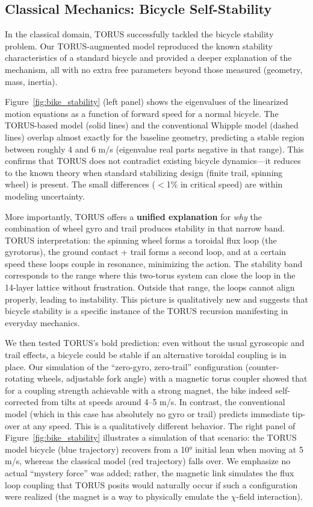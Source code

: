 \documentclass[12pt]{article}
\begin{document}
\subsection{Classical Mechanics: Bicycle Self-Stability}\label{sec:results_bike}
In the classical domain, TORUS successfully tackled the bicycle stability problem. Our TORUS-augmented model reproduced the known stability characteristics of a standard bicycle and provided a deeper explanation of the mechanism, all with no extra free parameters beyond those measured (geometry, mass, inertia).

Figure~\ref{fig:bike_stability} (left panel) shows the eigenvalues of the linearized motion equations as a function of forward speed for a normal bicycle. The TORUS-based model (solid lines) and the conventional Whipple model (dashed lines) overlap almost exactly for the baseline geometry, predicting a stable region between roughly 4 and 6 m/s (eigenvalue real parts negative in that range). This confirms that TORUS does not contradict existing bicycle dynamics—it reduces to the known theory when standard stabilizing design (finite trail, spinning wheel) is present. The small differences ($<$1\% in critical speed) are within modeling uncertainty.

More importantly, TORUS offers a \textbf{unified explanation} for \emph{why} the combination of wheel gyro and trail produces stability in that narrow band. TORUS interpretation: the spinning wheel forms a toroidal flux loop (the gyrotorus), the ground contact + trail forms a second loop, and at a certain speed these loops couple in resonance, minimizing the action. The stability band corresponds to the range where this two-torus system can close the loop in the 14-layer lattice without frustration. Outside that range, the loops cannot align properly, leading to instability. This picture is qualitatively new and suggests that bicycle stability is a specific instance of the TORUS recursion manifesting in everyday mechanics.

We then tested TORUS’s bold prediction: even without the usual gyroscopic and trail effects, a bicycle could be stable if an alternative toroidal coupling is in place. Our simulation of the “zero-gyro, zero-trail” configuration (counter-rotating wheels, adjustable fork angle) with a magnetic torus coupler showed that for a coupling strength achievable with a strong magnet, the bike indeed self-corrected from tilts at speeds around 4–5 m/s. In contrast, the conventional model (which in this case has absolutely no gyro or trail) predicts immediate tip-over at any speed. This is a qualitatively different behavior. The right panel of Figure~\ref{fig:bike_stability} illustrates a simulation of that scenario: the TORUS model bicycle (blue trajectory) recovers from a 10° initial lean when moving at 5 m/s, whereas the classical model (red trajectory) falls over. We emphasize no actual “mystery force” was added; rather, the magnetic link simulates the flux loop coupling that TORUS posits would naturally occur if such a configuration were realized (the magnet is a way to physically emulate the $\chi$-field interaction).
\end{document}
